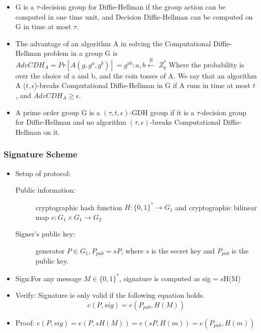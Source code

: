 \documentclass[11pt,a4paper]{llncs}
\begin{document}
\begin{itemize}
\item  G is a $\tau$-decision group for Diffie-Hellman if the group action
can be computed in one time unit, and Decision Diffie-Hellman can be computed
on G in time at most $\tau$.
\item The advantage of an algorithm A in solving the Computational
Diffie-Hellman problem in a group G is
\\
$AdvCDH_A = Pr[A(g, g^a , g^b )] = g^{ab} : a, b \xleftarrow R $ $Z^*_q$
Where the probability is over the choice of a and b, and the coin tosses of A.
We say that an algorithm A ($t, \epsilon$)-breaks Computational Diffie-Hellman in G if
A runs in time at most $t$, and $AdvCDH_A\geq \epsilon $.
\item A prime order group G is a $(\tau, t, \epsilon )$-GDH group if it is a $\tau$-decision group for Diffie-Hellman and no algorithm $(\tau, \epsilon)$-breaks Computational
Diffie-Hellman on it.
\end{itemize}
\subsubsection{Signature Scheme}
\begin{itemize}
\item Setup of protocol:
\begin{description}
\item[Public information:] cryptographic hash function $H : \{0,1\}^* \to G_1$ and cryptographic bilinear map $e:G_1\times G_1 \to G_2$
\item[Signer's public key:]generator $P \in G_1, P_{pub} = sP$, where $s$ is the secret key and $P_{pub}$ is the public key.
\end{description}
\item Sign:For any message $M \in \{0,1\}^*$, signature is computed as
sig = sH(M)
\item Verify: Signature is only valid if the following equation holds.
$$e(P, sig) = e(P_{pub}, H(M)) $$
\item Proof:
$e(P, sig)=e(P, sH(M))=e(sP, H(m))=e(P_{pub}, H(m))$
\end{itemize}
\end{document}
